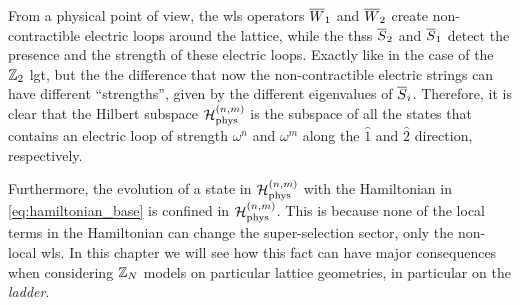 From a physical point of view, the \ac{wl}s operators $\overline{W}_1$ and $\overline{W}_2$ create non-contractible electric loops around the lattice, while  the \ac{ths}s $\overline{S}_2$ and $\overline{S}_1$ detect the presence and the strength of these electric loops.
Exactly like in the case of the $\mathbb{Z}_2$ \ac{lgt}, but the the difference that now the non-contractible electric strings can have different ``strengths'', given by the different eigenvalues of $\overline{S}_i$.
Therefore, it is clear that the Hilbert subspace $\mathcal{H}_{\text{phys}}^{(n, m)}$ is the subspace of all the states that contains an electric loop of strength $\omega^n$ and $\omega^{m}$ along the $\hat{1}$ and $\hat{2}$ direction, respectively.

Furthermore, the evolution of a state in $\mathcal{H}_{\text{phys}}^{(n,m)}$ with the Hamiltonian in \eqref{eq:hamiltonian_base} is confined in $\mathcal{H}_{\text{phys}}^{(n,m)}$.
This is because none of the local terms in the Hamiltonian can change the super-selection sector, only the non-local \ac{wl}s.
In this chapter we will see how this fact can have major consequences when considering $\mathbb{Z}_N$ models on particular lattice geometries, in particular on the \emph{ladder}.
